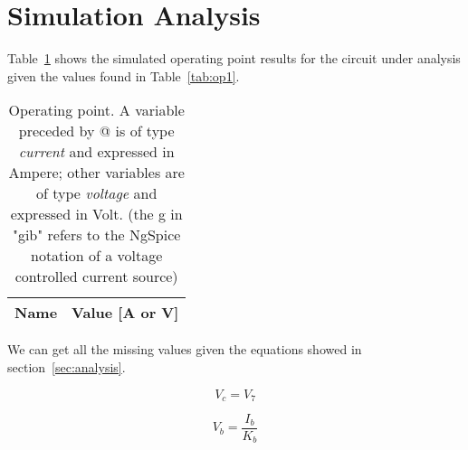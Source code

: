\newpage
\section{Simulation Analysis}
\label{sec:simulation}


Table~\ref{tab:op} shows the simulated operating point results for the circuit
under analysis given the values found in Table~\ref{tab:op1}. 

\begin{table}[h]
  \centering
  \begin{tabular}{|l|r|}
    \hline    
    {\bf Name} & {\bf Value [A or V]} \\ \hline
    
  \end{tabular}
  \caption{Operating point. A variable preceded by @ is of type {\em current}
    and expressed in Ampere; other variables are of type {\it voltage} and expressed in
    Volt. (the g in "gib" refers to the NgSpice notation of a voltage controlled current source)}
  \label{tab:op}
\end{table}

We can get all the missing values given the equations showed in section~\ref{sec:analysis}.

\begin{equation}
  V_c = V_7
  \label{eq:1}
\end{equation}

\begin{equation}
  V_b = \frac{I_b}{K_b}
\end{equation}










